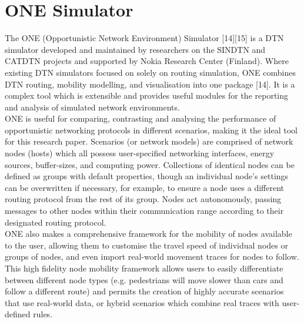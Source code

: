 \documentclass{article}
\begin{document}
\section{ONE Simulator}
The ONE (Opportunistic Network Environment) Simulator [14][15] is a DTN simulator developed and maintained by researchers on the SINDTN and CATDTN projects and supported by Nokia Research Center (Finland). Where existing DTN simulators focused on solely on routing simulation, ONE combines DTN routing, mobility modelling, and visualisation into one package [14]. It is a complex tool which is extensible and provides useful modules for the reporting and analysis of simulated network environments.\\
\newline ONE is useful for comparing, contrasting and analysing the performance of opportunistic networking protocols in different scenarios, making it the ideal tool for this research paper. Scenarios (or network models) are comprised of network nodes (hosts) which all possess user-specified networking interfaces, energy sources, buffer-sizes, and computing power. Collections of identical nodes can be defined as groups with default properties, though an individual node's settings can be overwritten if necessary, for example, to ensure a node uses a different routing protocol from the rest of its group. Nodes act autonomously, passing messages to other nodes within their communication range according to their designated routing protocol.\\ 
\newline ONE also makes a comprehensive framework for the mobility of nodes available to the user, allowing them to customise the travel speed of individual nodes or groups of nodes, and even import real-world movement traces for nodes to follow. This high fidelity node mobility framework allows users to easily differentiate between different node types (e.g. pedestrians will move slower than cars and follow a different route) and permits the creation of highly accurate scenarios that use real-world data, or hybrid scenarios which combine real traces with user-defined rules.\\
\end{document}
